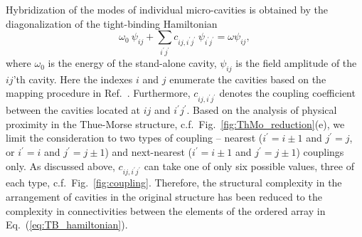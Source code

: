 Hybridization of the modes of individual micro-cavities is obtained by the diagonalization of the tight-binding Hamiltonian
\begin{equation}
\omega_0\ \psi_{ij}+\sum_{i^\prime j^\prime}c_{ij,i^\prime j^\prime}\ \psi_{i^\prime j^\prime}=\omega\psi_{ij},
\label{eq:TB_hamiltonian}
\end{equation}
where $\omega_0$ is the energy of the stand-alone cavity, $\psi_{ij}$ is the field amplitude of the $ij$'th cavity. Here the indexes $i$ and $j$ enumerate the cavities based on the mapping procedure in Ref.~. Furthermore, $c_{ij,i^\prime j^\prime}$ denotes the coupling coefficient between the cavities located at $ij$ and $i^\prime j^\prime$. Based on the analysis of physical proximity in the Thue-Morse structure, c.f.~Fig.~\ref{fig:ThMo_reduction}(e), we limit the consideration to two types of coupling -- nearest ($i^\prime=i\pm1$ and $j^\prime=j$, or $i^\prime=i$ and $j^\prime=j\pm1$) and next-nearest ($i^\prime=i\pm1$ and $j^\prime=j\pm1$) couplings only. As discussed above, $c_{ij,i^\prime j^\prime}$ can take one of only six possible values, three of each type, c.f.~Fig.~\ref{fig:coupling}. Therefore, the structural complexity in the arrangement of cavities in the original structure has been reduced to the complexity in connectivities between the elements of the ordered array in Eq.~(\ref{eq:TB_hamiltonian}). 

